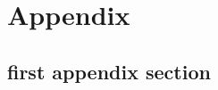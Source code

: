 \documentclass[
	oneside,
	bibliography=totocnumbered,
	toc=listofnumbered,
	listof=numbered,
	listof=totocnumbered,
	numbers=noenddot
]{scrbook}
\begin{document}
	\frontmatter			%
	
			\titlepageEN

			
			
			
			\declaration
		
			
			
			
			\markleft{\contentsname}	%
			\setSectioning				%
			\tableofcontents
			
			
	\mainmatter %
			
			
			
			
		
	
			\blinddocument
			\blindmathpaper
			
	\backmatter %
		
		
%		
		\listoffigures
		\listoftables
	\appendix	%
	\chapter{Appendix}
		\section{first appendix section}
		\blindtext[10]	
\end{document}
